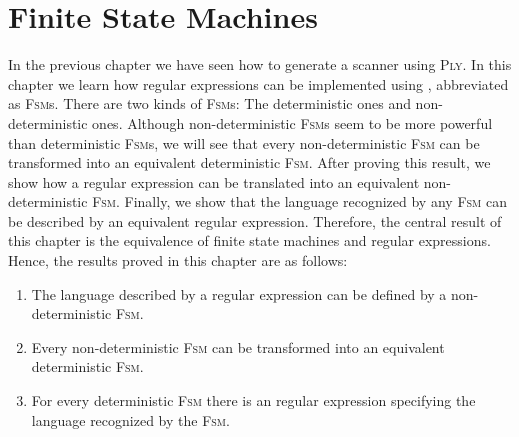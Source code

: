 \chapter{Finite State Machines\label{chapter:finit-state-machines.tex}} 
In the previous chapter we have seen how to generate a scanner using \textsc{Ply}.  In this chapter
we learn how regular expressions can be implemented using ,
abbreviated as \textsc{Fsm}s.  There are two kinds of \textsc{Fsm}s: The deterministic ones and
non-deterministic ones.  Although non-deterministic \textsc{Fsm}s seem to be more powerful than
deterministic \textsc{Fsm}s, we will see that every non-deterministic \textsc{Fsm} can be transformed
into an equivalent deterministic \textsc{Fsm}.  After proving this result, we show how a regular
expression can be translated into an equivalent non-deterministic \textsc{Fsm}.  Finally, we show that the
language recognized by any \textsc{Fsm} can be described by an equivalent regular expression.  Therefore, the
central result of this chapter is the equivalence of finite state machines and regular expressions.
Hence, the results proved in this chapter are as follows:
\begin{enumerate}
\item The language described by a regular expression can be defined by a non-deterministic \textsc{Fsm}.
\item Every non-deterministic \textsc{Fsm} can be transformed into an equivalent deterministic \textsc{Fsm}.
\item For every deterministic \textsc{Fsm} there is an regular expression specifying the language recognized by
      the \textsc{Fsm}.
\end{enumerate}


